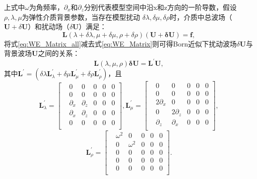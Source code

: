 上式中$\omega$为角频率，$\partial_x$和$\partial_z$分别代表模型空间中沿x和z方向的一阶导数，假设$\rho,\lambda,\mu$为弹性介质背景参数，当存在模型扰动
$\delta\lambda,\delta\mu,\delta\rho$时，介质中总波场（$\mathbf{U}+\delta
\mathbf{U}$）和扰动场（$\delta \mathbf{U}$）满足：
\begin{equation}
\mathbf{L}(\lambda+\delta\lambda,\mu+\delta\mu,\rho+\delta\rho)(\mathbf{U+\delta U})=\mathbf{f},
    \label{eq:WE_Matrix_all} 
\end{equation}
将式\eqref{eq:WE_Matrix_all}减去式\eqref{eq:WE_Matrix}则可得Born近似下扰动波场$\delta
\mathbf{U}$与背景波场$\mathbf{U}$之间的关系：
\begin{equation}
\mathbf{L}(\lambda,\mu,\rho)\mathbf{\delta U}=\mathbf{L}^{'}\mathbf{U},
    \label{eq:WE_Matrix_delta} 
\end{equation}
其中$\mathbf{L}^{'}=(\delta\lambda\mathbf{L}^{'}_{\lambda}+\delta\mu\mathbf{L}^{'}_{\mu}+\delta\rho\mathbf{L}^{'}_{\rho})$，且
\begin{equation}
        \mathbf{L}^{'}_{\lambda}=
        \begin{bmatrix}
			&0 &0 &0 & 0 &0\\
			& 0  &0 &0 &0 &0\\
			&\partial_x &\partial_z &0 &0&0\\
			& \partial_x  &\partial_z &0 &0&0\\
			& 0  &0&0 &0&0\\
        \end{bmatrix},
        \mathbf{L}^{'}_{\mu}=
        \begin{bmatrix}
            &0 &0 &0 & 0 &0\\
            & 0  &0 &0 &0 &0\\
            &2\partial_x &0 &0 &0&0\\
            & 0  &2\partial_z &0 &0&0\\
            & \partial_z  &\partial_x&0 &0&0\\
        \end{bmatrix},
        \label{eq:L_lambdamu}
\end{equation}
\begin{equation}
        \mathbf{L}^{'}_{\rho}=
        \begin{bmatrix}
		&\omega^2 &0 &0 & 0 &0\\
            & 0  &\omega^2 &0 &0 &0\\
            &0&0 &0 &0&0\\
            &0  &0 &0 &0&0\\
            & 0  &0&0 &0&0\\
        \end{bmatrix}.
        \label{eq:L_rho}
\end{equation}
